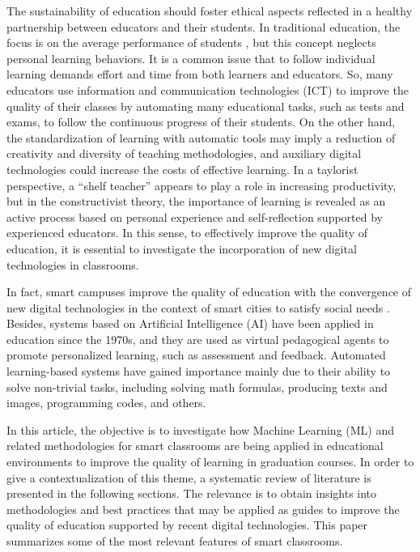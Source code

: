 \documentclass[english]{textolivre}
\begin{document}
The sustainability of education should foster ethical aspects reflected
in a healthy partnership between educators and their students. In
traditional education, the focus is on the average performance of
students \cite{Luan2021}, but this concept neglects personal learning
behaviors. It is a common issue that to follow individual learning
demands effort and time from both learners and educators. So, many
educators use information and communication technologies (ICT) to
improve the quality of their classes by automating many educational
tasks, such as tests and exams, to follow the continuous progress of
their students. On the other hand, the standardization of learning with
automatic tools may imply a reduction of creativity and diversity of
teaching methodologies, and auxiliary digital technologies could
increase the costs of effective learning. In a taylorist perspective, a
``shelf teacher'' appears to play a role in increasing productivity, but
in the constructivist theory, the importance of learning is revealed as
an active process based on personal experience and self-reflection
supported by experienced educators. In this sense, to effectively
improve the quality of education, it is essential to investigate the
incorporation of new digital technologies in classrooms.

In fact, smart campuses improve the quality of education with the
convergence of new digital technologies in the context of smart cities
to satisfy social needs \cite{ChamorroAtalaya2023}. Besides, systems
based on Artificial Intelligence (AI) have been applied in education
since the 1970s, and they are used as virtual pedagogical agents to
promote personalized learning, such as assessment and feedback.
Automated learning-based systems have gained importance mainly due to
their ability to solve non-trivial tasks, including solving math
formulas, producing texts and images, programming codes, and others.

In this article, the objective is to investigate how Machine Learning
(ML) and related methodologies for smart classrooms are being applied in
educational environments to improve the quality of learning in
graduation courses. In order to give a contextualization of this theme,
a systematic review of literature is presented in the following
sections. The relevance is to obtain insights into methodologies and
best practices that may be applied as guides to improve the quality of
education supported by recent digital technologies. This paper
summarizes some of the most relevant features of smart classrooms.
\end{document}
